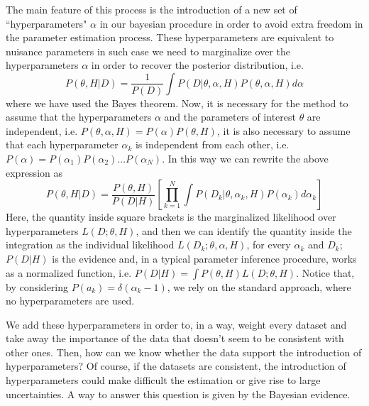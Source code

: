 \documentclass[onecolumn,           %
               showpacs,            %
               preprintnumbers,     %
               aps,                 %
               prl,          	    %
               letterpaper,             %
               superscriptaddress,      %
               nofootinbib,         %
               tightenlines,        %
               floats,floatfix      %
               ,usenatbib,
               ]{revtex4-1}
\begin{document}
The main feature of this process is the introduction of a new set of ``hyperparameters" $\alpha$ in our bayesian procedure in order to avoid extra freedom in the parameter estimation process.  These hyperparameters are equivalent to nuisance parameters in such case we need to marginalize over the hyperparameters $\alpha$ in order to recover the posterior distribution, i.e.
\begin{equation}
P(\theta,H|D)=\frac{1}{P(D)}\int P(D|\theta,\alpha,H)P(\theta,\alpha,H)d\alpha
\end{equation}
where we have used the Bayes theorem. Now, it is necessary for the method to assume that the hyperparameters $\alpha$ and the parameters of interest $\theta$ are independent, i.e. $P(\theta,\alpha,H)=P(\alpha)P(\theta,H)$, it is also necessary to assume that each hyperparameter $\alpha_k$ is independent from each other, i.e. $P(\alpha)=P(\alpha_1)P(\alpha_2)...P(\alpha_N)$. In this way we can rewrite the above expression as
\begin{equation}
P(\theta,H|D)=\frac{P(\theta,H)}{P(D|H)}\left[\prod_{k=1}^N\int P(D_k|\theta,\alpha_k,H)P(\alpha_k)d\alpha_k\right]
\end{equation}
Here, the quantity inside square brackets is the marginalized likelihood over hyperparameters $L(D;\theta,H)$, and then we can identify the quantity inside the integration as the individual likelihood $L(D_k;\theta,\alpha,H)$, for every $\alpha_k$ and $D_k$; $P(D|H)$ is the evidence and, in a typical parameter inference procedure, works as a normalized function, i.e. $P(D|H)=\int P(\theta,H)L(D;\theta,H)$. Notice that, by considering $P(a_k)=\delta(\alpha_k-1)$, we rely on the standard approach, where no hyperparameters are used.  

We add these hyperparameters in order to, in a way, weight every dataset and take away the importance of the data that doesn't seem to be consistent with other ones. Then, how can we know whether the data support the introduction of hyperparameters? Of course, if the datasets are consistent, the introduction of hyperparameters could make difficult the estimation or give rise to large uncertainties. A way to answer this question is given by the Bayesian evidence.
\end{document}
